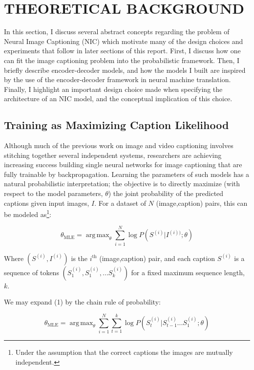 \documentclass[letterpaper, 10 pt, conference]{ieeeconf}
\DeclareMathOperator*{\argmax}{arg\,max}
\begin{document}
\section{THEORETICAL BACKGROUND}

In this section, I discuss several abstract concepts regarding the problem of Neural Image Captioning (NIC) which motivate many of the design choices and experiments that follow in later sections of this report. First, I discuss how one can fit the image captioning problem into the probabilistic framework. Then, I briefly describe encoder-decoder models, and how the models I built are inspired by the use of the encoder-decoder  framework in neural machine translation. Finally, I highlight an important design choice made when specifying the architecture of an NIC model, and the conceptual implication of this choice. 

\subsection{Training as Maximizing Caption Likelihood}

Although much of the previous work on image and video captioning involves stitching together several independent systems, researchers are achieving increasing success building single neural networks for image captioning that are fully trainable by backpropagation. Learning the parameters of such models has a natural probabilistic interpretation; the objective is to directly maximize (with respect to the model parameters, $\theta$) the joint probability of the predicted captions given input images, $I$. For a dataset of $N$ (image,caption) pairs, this can be modeled as\footnote{Under the assumption that the correct captions the images are mutually independent.}:

\begin{equation}
\theta_{\text{MLE}} = \argmax_{\theta}{\sum_{i = 1}^N{\log P(S^{(i)}|I^{(i))}; \theta)}}
\end{equation} 

Where $(S^{(i)}, I^{(i)})$ is the $i^{\text{th}}$ (image,caption) pair, and each caption $S^{(i)}$ is a sequence of tokens $(S^{(i)}_1, S^{(i)}_1, ... S^{(i)}_k)$ for a fixed maximum sequence length, $k$. 

We may expand (1) by the chain rule of probability:

\begin{equation}
\theta_{\text{MLE}} = \argmax_{\theta}{\sum_{i = 1}^N{\sum_{t = 1}^k{\log P(S_t^{(i)}|S_{t - 1}^{(i)} ... S_{1}^{(i)}; \theta)}}}
\end{equation} 
\end{document}
